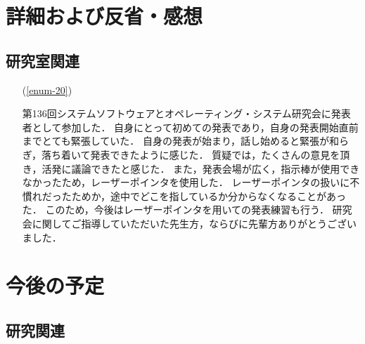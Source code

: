 \documentclass[fleqn, 12pt]{extarticle}
\begin{document}
    \section{詳細および反省・感想}
    \label{sec-3}

    \setcounter{subsection}{1}
    \subsection{研究室関連}
    \label{sec-3-2}

    \begin{itemize}

        \item[(\ref{enum-20})]
            \begin{spacing}{1.2}
            第136回システムソフトウェアとオペレーティング・システム研究会に発表者として参加した．
            自身にとって初めての発表であり，自身の発表開始直前までとても緊張していた．
            自身の発表が始まり，話し始めると緊張が和らぎ，落ち着いて発表できたように感じた．
            質疑では，たくさんの意見を頂き，活発に議論できたと感じた．
            また，発表会場が広く，指示棒が使用できなかったため，レーザーポインタを使用した．
            レーザーポインタの扱いに不慣れだったためか，途中でどこを指しているか分からなくなることがあった．
            このため，今後はレーザーポインタを用いての発表練習も行う．
            研究会に関してご指導していただいた先生方，ならびに先輩方ありがとうございました．
            \end{spacing}

    \end{itemize}

    \section{今後の予定}
    \label{sec-4}

    \subsection{研究関連}
    \label{sec-4-1}
\end{document}
